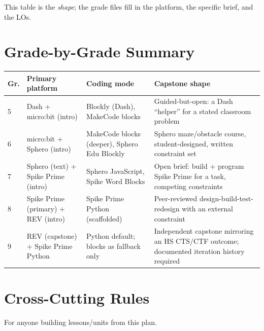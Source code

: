 \documentclass[10pt, a4paper]{article}
\begin{document}
\noindent This table is the \emph{shape}; the grade files fill in the platform, the specific brief, and the LOs.

\section{Grade-by-Grade Summary}

\begin{center}
\small
\begin{tabularx}{\linewidth}{@{}p{0.8cm}p{2.5cm}p{2.5cm}X@{}}
\toprule
\textbf{Gr.} & \textbf{Primary platform} & \textbf{Coding mode} & \textbf{Capstone shape} \\
\midrule
5 & Dash + micro:bit (intro) & Blockly (Dash), MakeCode blocks & Guided-but-open: a Dash ``helper'' for a stated classroom problem \\
6 & micro:bit + Sphero (intro) & MakeCode blocks (deeper), Sphero Edu Blockly & Sphero maze/obstacle course, student-designed, written constraint set \\
7 & Sphero (text) + Spike Prime (intro) & Sphero JavaScript, Spike Word Blocks & Open brief: build + program Spike Prime for a task, competing constraints \\
8 & Spike Prime (primary) + REV (intro) & Spike Prime Python (scaffolded) & Peer-reviewed design-build-test-redesign with an external constraint \\
9 & REV (capstone) + Spike Prime Python & Python default; blocks as fallback only & Independent capstone mirroring an HS CTS/CTF outcome; documented iteration history required \\
\bottomrule
\end{tabularx}
\end{center}

\section{Cross-Cutting Rules}

For anyone building lessons/units from this plan.
\end{document}
